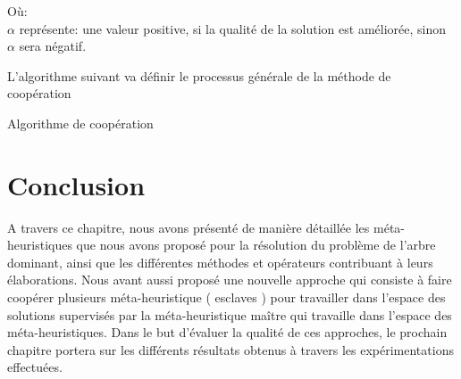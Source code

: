 Où:\\
$\alpha$ représente: une valeur positive, si la qualité de la solution est améliorée, sinon $\alpha$ sera négatif.

L’algorithme suivant va définir le processus générale de la méthode de coopération 

\begin{algorithm}[H]
\label{alg:CA}
\caption{Algorithme de coopération}
\SetAlgoLined
\DontPrintSemicolon

\end{algorithm}


\section{Conclusion}
A travers ce chapitre, nous avons présenté de manière détaillée les méta-heuristiques que nous avons proposé pour la résolution du problème de l’arbre dominant, ainsi que les différentes méthodes et opérateurs contribuant à leurs élaborations. Nous avant aussi proposé une nouvelle approche qui consiste à faire coopérer plusieurs méta-heuristique ( esclaves ) pour travailler dans l’espace des solutions supervisés par la méta-heuristique maître qui travaille dans l’espace des méta-heuristiques. Dans le but d’évaluer la qualité de ces approches, le prochain chapitre portera sur les différents résultats obtenus à travers les expérimentations effectuées.
